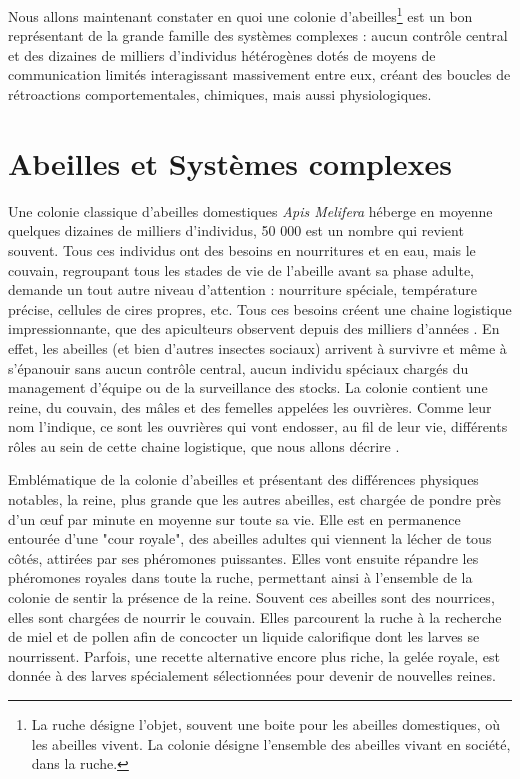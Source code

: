 			Nous allons maintenant constater en quoi une colonie d'abeilles\footnote{La ruche désigne l'objet, souvent une boite pour les abeilles domestiques, où les abeilles vivent. La colonie désigne l'ensemble des abeilles vivant en société, dans la ruche.} est un bon représentant de la grande famille des systèmes complexes : aucun contrôle central et des dizaines de milliers d'individus hétérogènes dotés de moyens de communication limités interagissant massivement entre eux, créant des boucles de rétroactions comportementales, chimiques, mais aussi physiologiques.
			
			

	
		\section{Abeilles et Systèmes complexes}	
		\label{sectionBio}	
			Une colonie classique d'abeilles domestiques \textit{Apis Melifera} héberge en moyenne quelques dizaines de milliers d'individus, 50 000 est un nombre qui revient souvent. Tous ces individus ont des besoins en nourritures et en eau, mais le couvain, regroupant tous les stades de vie de l'abeille avant sa phase adulte, demande un tout autre niveau d'attention : nourriture spéciale, température précise, cellules de cires propres, etc. Tous ces besoins créent une chaine logistique impressionnante, que des apiculteurs observent depuis des milliers d'années \cite{oldroyd_domestication_2012}. En effet, les abeilles (et bien d'autres insectes sociaux) arrivent à survivre et même à s'épanouir sans aucun contrôle central, aucun individu spéciaux chargés du management d'équipe ou de la surveillance des stocks. La colonie contient une reine, du couvain, des mâles et des femelles appelées les ouvrières. Comme leur nom l'indique, ce sont les ouvrières qui vont endosser, au fil de leur vie, différents rôles au sein de cette chaine logistique, que nous allons décrire \cite{winston_biology_1991, winston_role_1991, seeley_age_1991}. 
			
			Emblématique de la colonie d'abeilles et présentant des différences physiques notables, la reine, plus grande que les autres abeilles, est chargée de pondre près d'un œuf par minute en moyenne sur toute sa vie. Elle est en permanence entourée d'une "cour royale", des abeilles adultes qui viennent la lécher de tous côtés, attirées par ses phéromones puissantes. Elles vont ensuite répandre les phéromones royales dans toute la ruche, permettant ainsi à l'ensemble de la colonie de sentir la présence de la reine. Souvent ces abeilles sont des nourrices, elles sont chargées de nourrir le couvain. Elles parcourent la ruche à la recherche de miel et de pollen afin de concocter un liquide calorifique dont les larves se nourrissent. Parfois, une recette alternative encore plus riche, la gelée royale, est donnée à des larves spécialement sélectionnées pour devenir de nouvelles reines.
			
